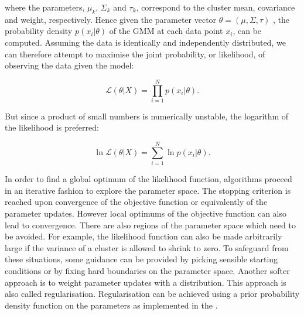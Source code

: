 where the parameters, $\mu_k$, $\Sigma_k$ and $\tau_k$, correspond to the cluster mean, covariance and weight, respectively.
Hence given the parameter vector $\theta = ( \mu, \Sigma, \tau )$ , the probability density $p(x_i|\theta)$ of the \gls{GMM} at each data point $x_i$, can be computed.
Assuming the data is identically and independently distributed, we can therefore attempt to maximise the joint probability, or likelihood,
of observing the data given the model:

\[
\mathcal{L}(\theta |X) = \prod_{i=1}^N p(x_i|\theta).
\]

But since a product of small numbers is numerically unstable, the logarithm of the likelihood is preferred:

\[
\ln \mathcal{L}(\theta |X) = \sum_{i=1}^N \ln p(x_i|\theta).
\]

In order to find a global optimum of the likelihood function, algorithms proceed in an iterative fashion to explore the parameter space.
The stopping criterion is reached upon convergence of the objective function or equivalently of the parameter updates.
However local optimums of the objective function can also lead to convergence.
There are also regions of the parameter space which need to be avoided.
For example, the likelihood function can also be made arbitrarily large if the variance of a cluster is allowed to shrink to zero.
To safeguard from these situations,
some guidance can be provided by picking sensible starting conditions or by fixing hard boundaries on the parameter space.
Another softer approach is to weight parameter updates with a distribution.
This approach is also called regularisation.
Regularisation can be achieved using a prior probability density function on the parameters as implemented in the .


